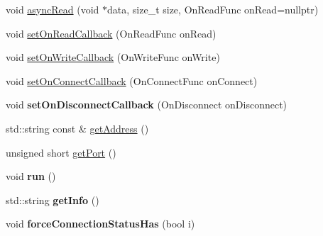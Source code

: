 \begin{DoxyCompactItemize}
void \hyperlink{classts_1_1common_1_1tcp_1_1_client_socket_afea6b565d0621b6d19648c0259b85e95}{async\+Read} (void $\ast$data, size\+\_\+t size, On\+Read\+Func on\+Read=nullptr)
\item 
void \hyperlink{classts_1_1common_1_1tcp_1_1_client_socket_a0fdc353f373b36eba7096ca88b957842}{set\+On\+Read\+Callback} (On\+Read\+Func on\+Read)
\item 
void \hyperlink{classts_1_1common_1_1tcp_1_1_client_socket_a6dc4758bd4b328dec0ee8cbc1a39820b}{set\+On\+Write\+Callback} (On\+Write\+Func on\+Write)
\item 
void \hyperlink{classts_1_1common_1_1tcp_1_1_client_socket_aeb8c00f0828b0d61c0f2a4b1aa486ff4}{set\+On\+Connect\+Callback} (On\+Connect\+Func on\+Connect)
\item 
\mbox{\label{classts_1_1common_1_1tcp_1_1_client_socket_ae03a9e025ffc06eede204954a634a96e}} 
void {\bfseries set\+On\+Disconnect\+Callback} (On\+Disconnect on\+Disconnect)
\item 
std\+::string const  \& \hyperlink{classts_1_1common_1_1tcp_1_1_client_socket_a77d1bdcdd306a6487626ecbbdb4a0910}{get\+Address} ()
\item 
unsigned short \hyperlink{classts_1_1common_1_1tcp_1_1_client_socket_a3e17803779e94e89f3cda035a280d315}{get\+Port} ()
\item 
\mbox{\label{classts_1_1common_1_1tcp_1_1_client_socket_a748fcc1565b851f1dd87dcf8c2d63057}} 
void {\bfseries run} ()
\item 
\mbox{\label{classts_1_1common_1_1tcp_1_1_client_socket_a7d1a90e4e2f918b899315a68cc3edd55}} 
std\+::string {\bfseries get\+Info} ()
\item 
\mbox{\label{classts_1_1common_1_1tcp_1_1_client_socket_aed2b9b1b3d589aaef9476df1f0800a6c}} 
void {\bfseries force\+Connection\+Status\+Has} (bool i)
\end{DoxyCompactItemize}
